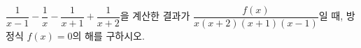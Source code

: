 \hspace*{2mm}\begin{minipage}[t]{\dimexpr\linewidth-2mm\relax}\vspace{0pt}
$\dfrac{1}{x-1}-\dfrac{1}{x}-\dfrac{1}{x+1}+\dfrac{1}{x+2}$을 계산한 결과가 $\dfrac{f(x)}{x(x+2)(x+1)(x-1)}$일 때, 방정식 $f(x)=0$의 해를 구하시오.\end{minipage}
